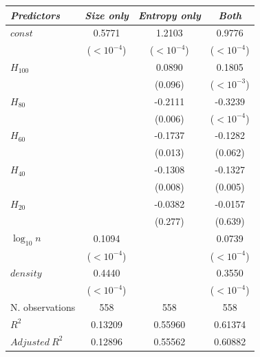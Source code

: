 \begin{tabular}{lccc}
\toprule
\textit{Predictors} & \textit{Size only} & \textit{Entropy only} & \textit{Both} \\
\midrule
$\mathit{const}$ & 0.5771 & 1.2103 & 0.9776 \\
 & {\scriptsize ($<10^{-4}$)} & {\scriptsize ($<10^{-4}$)} & {\scriptsize ($<10^{-4}$)} \\
$H_{100}$ &  & 0.0890 & 0.1805 \\
 &  & {\scriptsize (0.096)} & {\scriptsize ($<10^{-3}$)} \\
$H_{80}$ &  & -0.2111 & -0.3239 \\
 &  & {\scriptsize (0.006)} & {\scriptsize ($<10^{-4}$)} \\
$H_{60}$ &  & -0.1737 & -0.1282 \\
 &  & {\scriptsize (0.013)} & {\scriptsize (0.062)} \\
$H_{40}$ &  & -0.1308 & -0.1327 \\
 &  & {\scriptsize (0.008)} & {\scriptsize (0.005)} \\
$H_{20}$ &  & -0.0382 & -0.0157 \\
 &  & {\scriptsize (0.277)} & {\scriptsize (0.639)} \\
$\log_{10} n$ & 0.1094 &  & 0.0739 \\
 & {\scriptsize ($<10^{-4}$)} &  & {\scriptsize ($<10^{-4}$)} \\
$\mathit{density}$ & 0.4440 &  & 0.3550 \\
 & {\scriptsize ($<10^{-4}$)} &  & {\scriptsize ($<10^{-4}$)} \\
\midrule
N. observations & 558 & 558 & 558 \\
$R^2$ & 0.13209 & 0.55960 & 0.61374 \\
$\mathit{Adjusted}~R^2$ & 0.12896 & 0.55562 & 0.60882 \\
\bottomrule
\end{tabular}

